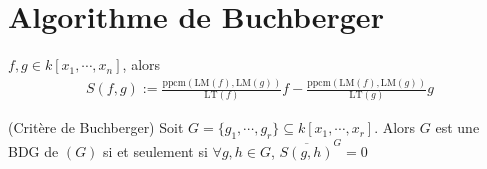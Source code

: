     \section{Algorithme de Buchberger}
        \begin{defi}
            $f,g \in k[x_1, \cdots, x_n]$, alors
            \begin{align*}
                S(f,g) := \frac{\mathrm{ppcm} (\mathrm{LM}(f), \mathrm{LM}(g))}{\mathrm{LT}(f)}f - \frac{\mathrm{ppcm} (\mathrm{LM}(f), \mathrm{LM}(g))}{\mathrm{LT}(g)}g
            \end{align*}
        \end{defi}
        \begin{theo} (Critère de Buchberger)
            Soit $G = \{g_1, \cdots, g_r\} \subseteq k[x_1, \cdots, x_r]$. Alors $G$ est une BDG de $(G)$ si et seulement si $\forall g,h \in G$, $\overline{S(g,h)}^G = 0$
        \end{theo}
